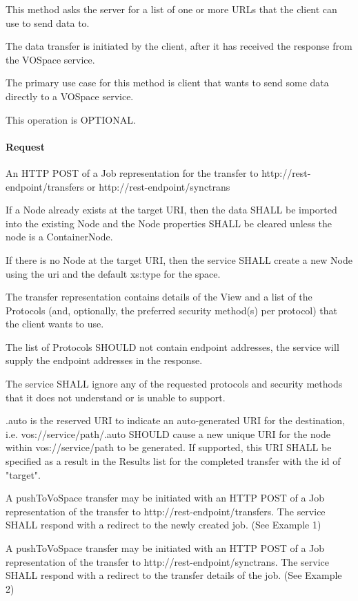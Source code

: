 \documentclass[11pt,a4paper]{ivoa}
\begin{document}
This method asks the server for a list of one or more URLs that the client can use to send data to.

The data transfer is initiated by the client, after it has received the response from the VOSpace service.

The primary use case for this method is client that wants to send some data directly to a VOSpace service.

This operation is OPTIONAL.

\paragraph{Request}
An HTTP POST of a Job representation for the transfer to http://rest-endpoint/transfers or http://rest-endpoint/synctrans

If a Node already exists at the target URI, then the data SHALL be imported into the existing Node and the Node properties SHALL be cleared unless the node is a ContainerNode.

If there is no Node at the target URI, then the service SHALL create a new Node using the uri and the default xs:type for the space.

The transfer representation contains details of the View and a list of the Protocols (and, optionally, the preferred security method(s) per protocol) that the client wants to use.

The list of Protocols SHOULD not contain endpoint addresses, the service will supply the endpoint addresses in the response.

The service SHALL ignore any of the requested protocols and security methods that it does not understand or is unable to support.

.auto is the reserved URI to indicate an auto-generated URI for the destination, i.e. vos://service/path/.auto SHOULD cause a new unique URI for the node within vos://service/path to be generated.  If supported, this URI SHALL be specified as a result in the Results list for the completed transfer with the id of "target".

A pushToVoSpace transfer may be initiated with an HTTP POST of a Job representation of the transfer to http://rest-endpoint/transfers. The service SHALL respond with a redirect to the newly created job.  (See Example 1)

A pushToVoSpace transfer may be initiated with an HTTP POST of a Job representation of the transfer to http://rest-endpoint/synctrans. The service SHALL respond with a redirect to the transfer details of the job.  (See Example 2)
\end{document}
